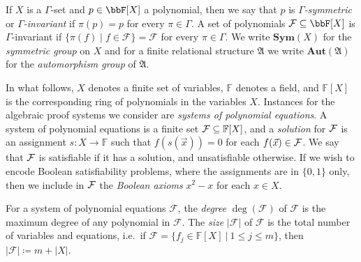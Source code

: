 \documentclass[10pt,a4paper]{article}
\newcommand{\Aut}{\mathbf{Aut}}
\newcommand{\Sym}{{\mathbf{Sym}}}
\renewcommand{\phi}{\varphi}
\renewcommand{\phi}{\varphi}
\renewcommand{\AA}{{\mathfrak A}}
\newcommand{\Ff}{{\cal F}}
\newcommand{\defset}[2]{\ensuremath{\{ #1 ~|~  #2 \}}}
\newcommand{\Field}{\ensuremath{\mathbb{F}}}
\newcommand{\F}{\ensuremath{\mathcal{F}}}
\begin{document}
	If $X$ is a $\Gamma$-set and $p \in \bbF[X]$ a polynomial, then we say that $p$ is \emph{$\Gamma$-symmetric} or \emph{$\Gamma$-invariant} if $\pi(p) = p$ for every $\pi \in \Gamma$.  A set of polynomials $\F \subseteq \bbF[X]$ is $\Gamma$-invariant if $\{ \pi(f) \mid f \in \F  \} = \F$ for every $\pi \in \Gamma$.
	We write $\Sym(X)$ for the \emph{symmetric group} on $X$ and for a finite relational structure $\AA$ we write $\Aut(\AA)$ for the \emph{automorphism group} of $\AA$.
	
	In what follows, $X$ denotes a finite set of variables, $\Field$ denotes a field, and $\Field[X]$ is the corresponding ring of polynomials in the variables $X$. 
	Instances for the algebraic proof systems we consider are \emph{systems of polynomial equations}. A system of polynomial equations is a finite set $\Ff \subseteq \Field[X]$, and a \emph{solution} for $\Ff$ is an assignment $s: X \rightarrow \Field$ such that $f(s(\vec x)) = 0$ for each $f(\vec x) \in \Ff$. We say that $\Ff$ is satisfiable if it has a solution, and unsatisfiable otherwise. If we wish to encode Boolean satisfiability problems, where the assignments are in $\{0,1\}$ only, then we include in $\Ff$ the \emph{Boolean axioms} $x^2-x$ for each $x \in X$. 	
	 
	For a system of polynomial equations $\F$, the \emph{degree} $\deg(\F)$ of $\F$ is the maximum degree of any polynomial in $\F$.  The \emph{size} $|\F|$ of $\F$ is the total number of variables and equations, i.e.\ if $\F = \defset{f_j\in \Field[X]}{1 \leq j \leq m}$, then $|\F| \coloneqq m + |X|$.
	
	

	
\end{document}
